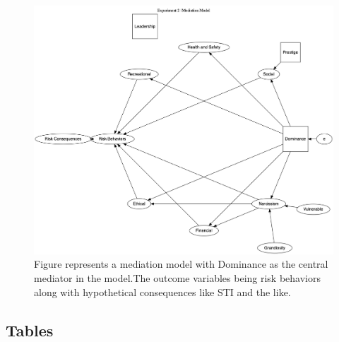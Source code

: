 \documentclass[
  donotrepeattitle,doc, 12pt, a4paper,floatsintext]{apa7}
\begin{document}
\newpage

\begin{landscape}

\begin{figure}

{\centering \includegraphics[width=1\linewidth]{../Chapters/GraphsandTables/diagramme_graph_sem} 

}

\caption{Figure represents a mediation model with Dominance as the central mediator in the model.The outcome variables being risk behaviors along with hypothetical consequences like STI and the like.}\label{fig:Experiment2ModelSEM}
\end{figure}

\end{landscape}

\newpage

\hypertarget{tables}{%
\subsection{Tables}\label{tables}}
\end{document}
